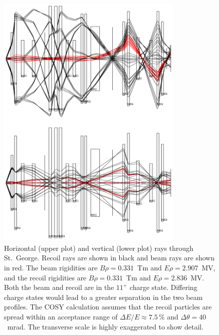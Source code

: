 \begin{figure}
    \begin{center}
        \centerline{
            \includegraphics[width=0.8\textwidth]{figures/raytrace.png}}
        \caption[Horizontal and vertical rays through St.\
            George]{Horizontal (upper plot) and vertical (lower plot)
            rays through St.\ George. Recoil \nuc{41}{Sc} rays are shown
            in black and beam \nuc{40}{Ca} rays are shown in red.
            The beam rigidities are $B\rho = 0.331$~Tm and $E\rho =
            2.907$~MV, and the recoil rigidities are $B\rho = 0.331$~Tm
            and $E\rho = 2.836$~MV. Both the beam and recoil are in the
            $11^+$ charge state. Differing charge states would lead to a
            greater separation in the two beam profiles. The COSY
            calculation assumes that the recoil particles are spread
            within an acceptance range of $\Delta E/E \approx7.5$\,\%
            and $\Delta\theta = 40$~mrad. The transverse scale is highly
            exaggerated to show detail.}
        \label{fig:raytrace}
    \end{center}
\end{figure}


